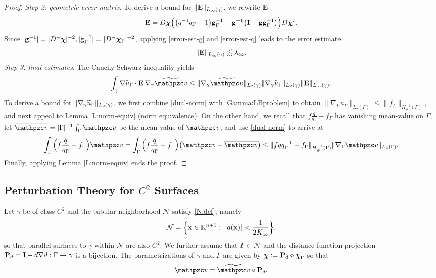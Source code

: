\begin{proof}
\smallskip\noindent
{\it Step 2: geometric error matrix}.
To derive a bound for $\|{\bf E} \|_{L_\infty(\gamma)}$, we rewrite ${\bf E}$
%
\[
{\bf E} = D{\boldsymbol \chi} \Big( \big(q^{-1}q_\Gamma-1\big) {\bf g}^{-1}_\Gamma
- {\bf g}^{-1} \big({\bf I} - {\bf g}{\bf g}_\Gamma^{-1} \big) \Big) D{\boldsymbol \chi}^t .
\]
%
Since $|{\bf g}^{-1}|=|D^-{\boldsymbol \chi}|^{-2}, |{\bf g}_\Gamma^{-1}|=|D^-{\boldsymbol \chi}_\Gamma|^{-2}$,
applying \eqref{error-est-g} and \eqref{error-est-q} leads to the error estimate
%
\begin{equation}\label{bound-E}
\|{\bf E} \|_{L_\infty(\gamma)} \lesssim \lambda_\infty.
\end{equation}
%
\smallskip\noindent
{\it Step 3: final estimates}.
The Cauchy-Schwarz inequality yields
%
\[
\int_\gamma \nabla \wu_\Gamma \cdot \bE \, \nabla_\gamma \ttv \le
\|\nabla_\gamma \ttv\|_{L_2(\gamma)}
\|\nabla_\gamma \wu_\Gamma\|_{L_2(\gamma)} \|\bE \|_{L_\infty(\gamma)}.
\]
%
To derive a bound for $\|\nabla_\gamma \widetilde{u}_\Gamma\|_{L_2(\gamma)}$,
we first combine \eqref{dual-norm} with \eqref{Gamma:LBproblem} to obtain
$\|\nabla_\Gamma u_\Gamma\|_{L_2(\Gamma)} \le \|f_\Gamma\|_{H^{-1}_\#(\Gamma)}$,
and next appeal to Lemma \ref{L:norm-equiv} (norm equivalence).
%
On the other hand, we recall that $f\frac{q}{q_\Gamma}-f_\Gamma$ has vanishing mean-value on
$\Gamma$, let $\overline{\tv} = |\Gamma|^{-1} \int_\Gamma \tv$ be the mean-value
of $\tv$, and use \eqref{dual-norm} to arrive at
%
\[
\int_\Gamma \Big(f\frac{q}{q_\Gamma} - f_\Gamma \Big) \tv =
\int_\Gamma \Big(f\frac{q}{q_\Gamma} - f_\Gamma \Big) \big( \tv - \overline{\tv} \big)
\le \|f q q_\Gamma^{-1} - f_\Gamma \|_{H^{-1}_\#(\Gamma)} \|\nabla_\Gamma\tv\|_{L_2(\Gamma)}.
\]
%
Finally, applying Lemma \ref{L:norm-equiv} ends the proof.
\end{proof}
  

\subsection{Perturbation Theory for $C^2$ Surfaces}\label{S:perturb-C2}
%
Let $\gamma$ be of class $C^2$ and the tubular neighborhood $\mathcal{N}$
satisfy \eqref{N:def}, namely
%
\begin{equation}\label{N:def-2}
\mathcal{N} = \Big\{ {\bf x}\in\mathbb{R}^{n+1}: ~ |d({\bf x})| < \frac{1}{2K_\infty} \Big\},
\end{equation}
%
so that parallel surfaces to $\gamma$ within $\mathcal{N}$ are also $C^2$.
We further assume that $\Gamma\subset\mathcal{N}$ and the distance function projection
${\bf P}_d={\bf I}-d\nabla d:\Gamma \rightarrow \gamma$ is a bijection. The parametrizations
of $\gamma$ and $\Gamma$ are given by ${\boldsymbol \chi} := {\bf P}_d \circ {\boldsymbol \chi}_\Gamma$ so that
%
\[
\tv = \widetilde{\tv} \circ \bP_d.
\]


